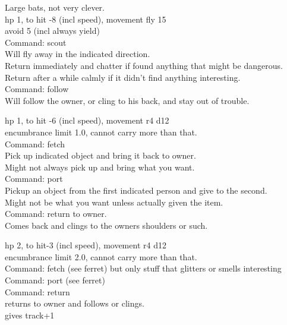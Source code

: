 Large bats, not very clever. \\
hp 1, to hit -8 (incl speed), movement fly 15 \\
avoid 5 (incl always yield) \\
Command: scout \\
Will fly away in the indicated direction. \\
Return immediately and chatter if found anything that might be dangerous. \\
Return after a while calmly if it didn't find anything interesting. \\
Command: follow \\
Will follow the owner, or cling to his back, and stay out of trouble.


hp 1, to hit -6 (incl speed), movement r4 d12 \\
encumbrance limit 1.0, cannot carry more than that. \\
Command: fetch \\
Pick up indicated object and bring it back to owner. \\
Might not always pick up and bring what you want. \\
Command: port \\
Pickup an object from the first indicated person and give to the second. \\
Might not be what you want unless actually given the item. \\
Command: return to owner. \\
Comes back and clings to the owners shoulders or such.


hp 2, to hit-3 (incl speed), movement r4 d12 \\
encumbrance limit 2.0, cannot carry more than that. \\
Command: fetch (see ferret) but only stuff that glitters or smells interesting \\
Command: port (see ferret) \\
Command: return \\
returns to owner and follows or clings. \\
gives track+1


